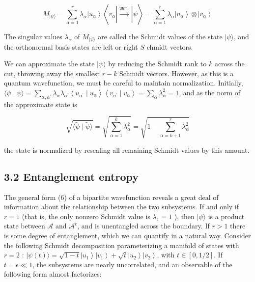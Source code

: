 \documentclass[12pt]{article}
\begin{document}
\begin{equation*}
M_{|\psi\rangle}=\sum_{\alpha=1}^{r} \lambda_{\alpha}\left|u_{\alpha}\right\rangle\left\langle v_{\alpha}\left|\xrightarrow{\mathfrak{M}^{-1}}\right| \psi\right\rangle=\sum_{\alpha=1}^{r} \lambda_{\alpha}\left|u_{\alpha}\right\rangle \otimes\left|v_{\alpha}\right\rangle \tag{6}
\end{equation*}


The singular values $\lambda_{\alpha}$ of $M_{|\psi\rangle}$ are called the Schmidt values of the state $|\psi\rangle$, and the orthonormal basis states are left or right $S$ chmidt vectors.

We can approximate the state $|\psi\rangle$ by reducing the Schmidt rank to $k$ across the cut, throwing away the smallest $r-k$ Schmidt vectors. However, as this is a quantum wavefunction, we must be careful to maintain normalization. Initially, $\langle\psi \mid \psi\rangle=\sum_{\alpha, \alpha^{\prime}} \lambda_{\alpha} \lambda_{\alpha^{\prime}}\left\langle u_{\alpha^{\prime}} \mid u_{\alpha}\right\rangle\left\langle v_{\alpha^{\prime}} \mid v_{\alpha}\right\rangle=\sum_{\alpha} \lambda_{\alpha}^{2}=1$, and as the norm of the approximate state is


\begin{equation*}
\sqrt{\langle\tilde{\psi} \mid \tilde{\psi}\rangle}=\sqrt{\sum_{\alpha=1}^{k} \lambda_{\alpha}^{2}}=\sqrt{1-\sum_{\alpha=k+1}^{r} \lambda_{\alpha}^{2}} \tag{7}
\end{equation*}


the state is normalized by rescaling all remaining Schmidt values by this amount.

\subsection*{3.2 Entanglement entropy}
The general form (6) of a bipartite wavefunction reveals a great deal of information about the relationship between the two subsystems. If and only if $r=1$ (that is, the only nonzero Schmidt value is $\lambda_{1}=1$ ), then $|\psi\rangle$ is a product state between $\mathcal{A}$ and $\mathcal{A}^{c}$, and is unentangled across the boundary. If $r>1$ there is some degree of entanglement, which we can quantify in a natural way. Consider the following Schmidt decomposition parameterizing a manifold of states with $r=2$ : $|\psi(t)\rangle=\sqrt{1-t}\left|u_{1}\right\rangle\left|v_{1}\right\rangle+\sqrt{t}\left|u_{2}\right\rangle\left|v_{2}\right\rangle$, with $t \in[0,1 / 2]$. If $t=\epsilon \ll 1$, the subsystems are nearly uncorrelated, and an observable of the following form almost factorizes:
\end{document}
